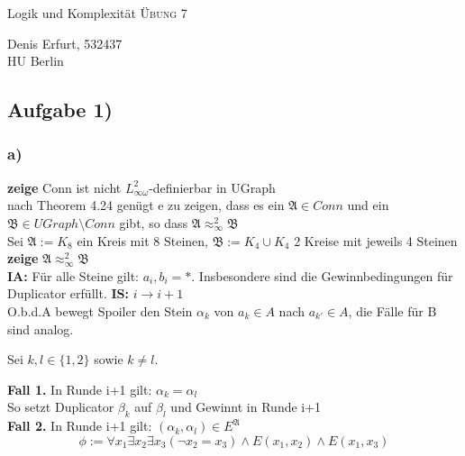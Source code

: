 \documentclass[12pt]{article}
\begin{document}
\begin{center}
\Large
Logik und Komplexität  \textsc{ Übung 7 }
\end{center}

\begin{flushright}
Denis Erfurt, 532437\\
HU Berlin \\

\vspace{2 mm}

\end{flushright}

\subsection*{Aufgabe 1)}
\subsubsection*{a)}

\textbf{zeige} Conn ist nicht $L_{\infty \omega}^2$-definierbar in UGraph \\
nach Theorem 4.24 genügt e zu zeigen, dass es ein $\mathfrak{A}\in Conn$ und 
ein $\mathfrak{B}\in UGraph \setminus Conn$ gibt, so dass 
$\mathfrak{A}\approx^2_\infty \mathfrak{B}$ \\
Sei $\mathfrak{A} := K_8$ ein Kreis mit 8 Steinen, 
$\mathfrak{B}:=K_4\cup K_4$ 2 Kreise mit jeweils 4 Steinen \\
\textbf{zeige } $\mathfrak{A}\approx^2_\infty \mathfrak{B}$\\
\textbf{IA: } Für alle Steine gilt: $a_i,b_i = *$. Insbesondere sind
die Gewinnbedingungen für Duplicator erfüllt.
\textbf{IS: } $i \rightarrow  i+1$\\

O.b.d.A bewegt Spoiler den Stein $\alpha_k$ von $a_k\in A$ nach $a_{k'}\in A$,
die Fälle für B sind analog.

Sei $k,l\in \{1,2\}$ sowie $k\neq l$.

\textbf{Fall 1.} In Runde i+1 gilt: $\alpha_k = \alpha_l$ \\
So setzt Duplicator $\beta_k$ auf $\beta_l$ und Gewinnt in Runde i+1\\

\textbf{Fall 2.} In Runde i+1 gilt: $(\alpha_k, \alpha_l) \in E^\mathfrak{A}$\\

\[ \phi := \forall x_1 \exists x_2 \exists x_3 ( \neg x_2 = x_3 ) \land E(x_1,x_2) \land E(x_1,x_3) \] 
\end{document}
